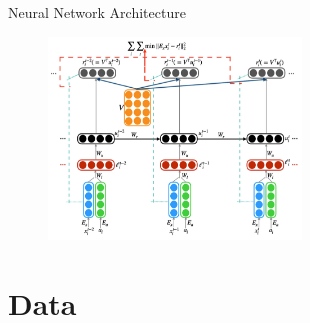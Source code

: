 \documentclass{beamer}
\begin{document}
\begin{frame}[allowframebreaks]{Neural Network Architecture}
	\begin{figure}[htpb]
		\centering
		\includegraphics[width=0.6\textwidth]{pic/nn-arch.png}
	\end{figure}
\end{frame}

\section{Data}
\end{document}
